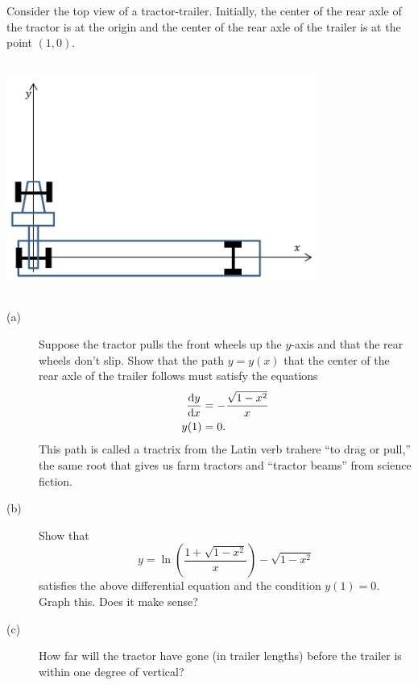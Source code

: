 \begin{embeddedproblem}{}\label{prob:tractrix1}
Consider the top view of a tractor-trailer.  Initially, the center of
the rear axle of the tractor is at the origin and the center of the
rear axle of the trailer is at the point $(1,0).$
  \centerline{\includegraphics*[height=3in,width=4in]{Figures/Tractrix}}
  \begin{description}
  \item[(a)] 	Suppose the tractor pulls the front wheels up the
    $y$-axis and that the rear wheels don't slip.  Show that the path
    $y=y(x)$ that the center of the rear axle of the trailer follows
    must satisfy the equations 
    \begin{align*}
      \frac{\text{d}{y}}{\text{d}{x}}&=-\frac{\sqrt{1-x^2}}{x}\\
      y(1)&=0.
    \end{align*}
    This path is called a tractrix from the Latin verb trahere ``to
    drag or pull,'' the same root that gives us farm tractors and
    ``tractor beams'' from science fiction.
  \item[(b)] 	Show that  
    $$
    y=\ln\left(\frac{1+\sqrt{1-x^2}}{x}\right)-\sqrt{1-x^2}
    $$
    satisfies the above differential equation and the condition $y(1)=0.$
    Graph this.  Does it make sense?
  \item[(c)] How far will the tractor have gone (in trailer
    lengths) before the trailer is within one degree of vertical?
  \end{description}
\end{embeddedproblem}

